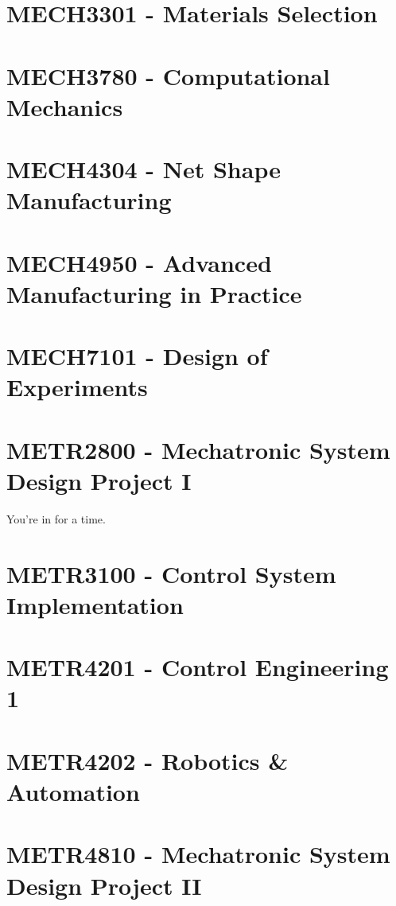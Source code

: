 \documentclass[a4paper,12pt]{report}
\begin{document}
\hypertarget{MECH3301}{\section{MECH3301 - Materials Selection}}

\hypertarget{MECH3780}{\section{MECH3780 - Computational Mechanics}}

\hypertarget{MECH4304}{\section{MECH4304 - Net Shape Manufacturing}}

\hypertarget{MECH4950}{\section{MECH4950 - Advanced Manufacturing in Practice}}

\hypertarget{MECH7101}{\section{MECH7101 - Design of Experiments}}

\hypertarget{METR2800}{\section{METR2800 - Mechatronic System Design Project I}}
You're in for a time.

\hypertarget{METR3100}{\section{METR3100 - Control System Implementation}}

\hypertarget{METR4201}{\section{METR4201 - Control Engineering 1}}

\hypertarget{METR4202}{\section{METR4202 - Robotics \& Automation}}

\hypertarget{METR4810}{\section{METR4810 - Mechatronic System Design Project II}}
\end{document}
